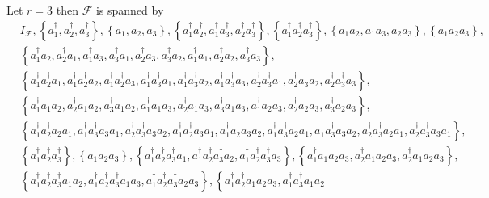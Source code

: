 \documentclass[aps,preprint]{revtex4}%
\begin{document}
Let $r=3$ then $\mathcal{F}$ is spanned by
\begin{align}
&  I_{\mathcal{F}},\left\{  a_{1}^{\dagger},a_{2}^{\dagger},a_{3}^{\dagger
}\right\}  ,\left\{  a_{1},a_{2},a_{3}\right\}  ,\left\{  a_{1}^{\dagger}%
a_{2}^{\dagger},a_{1}^{\dagger}a_{3}^{\dagger},a_{2}^{\dagger}a_{3}^{\dagger
}\right\}  ,\left\{  a_{1}^{\dagger}a_{2}^{\dagger}a_{3}^{\dagger}\right\}
,\left\{  a_{1}a_{2},a_{1}a_{3},a_{2}a_{3}\right\}  ,\left\{  a_{1}a_{2}%
a_{3}\right\}  ,\\
&  \left\{  a_{1}^{\dagger}a_{2},a_{2}^{\dagger}a_{1},a_{1}^{\dagger}%
a_{3},a_{3}^{\dagger}a_{1},a_{2}^{\dagger}a_{3},a_{3}^{\dagger}a_{2}%
,a_{1}^{\dagger}a_{1},a_{2}^{\dagger}a_{2},a_{3}^{\dagger}a_{3}\right\}  ,\\
&  \left\{  a_{1}^{\dagger}a_{2}^{\dagger}a_{1},a_{1}^{\dagger}a_{2}^{\dagger
}a_{2},a_{1}^{\dagger}a_{2}^{\dagger}a_{3},a_{1}^{\dagger}a_{3}^{\dagger}%
a_{1},a_{1}^{\dagger}a_{3}^{\dagger}a_{2},a_{1}^{\dagger}a_{3}^{\dagger}%
a_{3},a_{2}^{\dagger}a_{3}^{\dagger}a_{1},a_{2}^{\dagger}a_{3}^{\dagger}%
a_{2},a_{2}^{\dagger}a_{3}^{\dagger}a_{3}\right\}  ,\\
&  \left\{  a_{1}^{\dagger}a_{1}a_{2},a_{2}^{\dagger}a_{1}a_{2},a_{3}%
^{\dagger}a_{1}a_{2},a_{1}^{\dagger}a_{1}a_{3},a_{2}^{\dagger}a_{1}a_{3}%
,a_{3}^{\dagger}a_{1}a_{3},a_{1}^{\dagger}a_{2}a_{3},a_{2}^{\dagger}a_{2}%
a_{3},a_{3}^{\dagger}a_{2}a_{3}\right\}  ,\\
&  \left\{  a_{1}^{\dagger}a_{2}^{\dagger}a_{2}a_{1},a_{1}^{\dagger}%
a_{3}^{\dagger}a_{3}a_{1},a_{2}^{\dagger}a_{3}^{\dagger}a_{3}a_{2}%
,a_{1}^{\dagger}a_{2}^{\dagger}a_{3}a_{1},a_{1}^{\dagger}a_{2}^{\dagger}%
a_{3}a_{2},a_{1}^{\dagger}a_{3}^{\dagger}a_{2}a_{1},a_{1}^{\dagger}%
a_{3}^{\dagger}a_{3}a_{2},a_{2}^{\dagger}a_{3}^{\dagger}a_{2}a_{1}%
,a_{2}^{\dagger}a_{3}^{\dagger}a_{3}a_{1}\right\}  ,\\
&  \left\{  a_{1}^{\dagger}a_{2}^{\dagger}a_{3}^{\dagger}\right\}  ,\left\{
a_{1}a_{2}a_{3}\right\}  ,\left\{  a_{1}^{\dagger}a_{2}^{\dagger}%
a_{3}^{\dagger}a_{1},a_{1}^{\dagger}a_{2}^{\dagger}a_{3}^{\dagger}a_{2}%
,a_{1}^{\dagger}a_{2}^{\dagger}a_{3}^{\dagger}a_{3}\right\}  ,\left\{
a_{1}^{\dagger}a_{1}a_{2}a_{3},a_{2}^{\dagger}a_{1}a_{2}a_{3},a_{2}^{\dagger
}a_{1}a_{2}a_{3}\right\}  ,\\
&  \left\{  a_{1}^{\dagger}a_{2}^{\dagger}a_{3}^{\dagger}a_{1}a_{2}%
,a_{1}^{\dagger}a_{2}^{\dagger}a_{3}^{\dagger}a_{1}a_{3},a_{1}^{\dagger}%
a_{2}^{\dagger}a_{3}^{\dagger}a_{2}a_{3}\right\}  ,\left\{  a_{1}^{\dagger
}a_{2}^{\dagger}a_{1}a_{2}a_{3},a_{1}^{\dagger}a_{3}^{\dagger}a_{1}a_{2}%

\end{align}
\end{document}
